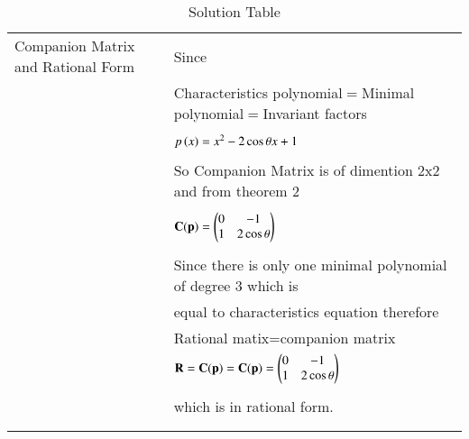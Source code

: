 \documentclass[journal,12pt]{IEEEtran}
\begin{document}
\begin{longtable}{|l|l|}
\hline
\multirow{3}{*}{Companion Matrix and Rational Form} & \\
&Since\\
&\\
&Characteristics polynomial$=$Minimal polynomial$=$Invariant factors\\
&\\
&$p\left(x\right)=x^2-2\cos\theta x +1$\\
&\\
&So Companion Matrix is of dimention 2x2 and from theorem 2\\
&\\
&$\mathbf{C(p)}=\begin{pmatrix}0&-1\\1&2\cos\theta\end{pmatrix}$\\
&\\
&Since there is only one minimal polynomial of degree 3 
which is\\ &equal to characteristics equation therefore\\ &Rational matix=companion matrix\\ 
&$\mathbf{R}=\mathbf{C(p)}=\mathbf{C(p)}=\begin{pmatrix}0&-1\\1&2\cos\theta\end{pmatrix}$\\
&\\
&which is in rational form.\\
&\\
\hline

\caption{Solution Table}
\label{table:2}
\end{longtable}
\end{document}

